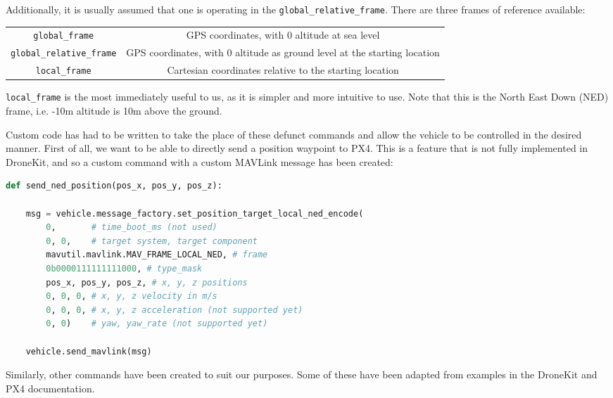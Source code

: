 \documentclass[11pt,twoside]{article}
\begin{document}
Additionally, it is usually assumed that one is operating in the \lstinline|global_relative_frame|. There are three frames of reference available:
\begin{center}
\begin{tabular}{cc}
    \lstinline|global_frame| & GPS coordinates, with 0 altitude at sea level \\
    \lstinline|global_relative_frame| & GPS coordinates, with 0 altitude as ground level at the starting location \\
    \lstinline|local_frame| & Cartesian coordinates relative to the starting location
\end{tabular}
\end{center}
\lstinline|local_frame| is the most immediately useful to us, as it is simpler and more intuitive to use. Note that this is the North East Down (NED) frame, i.e. -10m altitude is 10m above the ground.

Custom code has had to be written to take the place of these defunct commands and allow the vehicle to be controlled in the desired manner. First of all, we want to be able to directly send a position waypoint to PX4. This is a feature that is not fully implemented in DroneKit, and so a custom command with a custom MAVLink message has been created:
\begin{lstlisting}[language=Python]
def send_ned_position(pos_x, pos_y, pos_z):

    msg = vehicle.message_factory.set_position_target_local_ned_encode(
        0,       # time_boot_ms (not used)
        0, 0,    # target system, target component
        mavutil.mavlink.MAV_FRAME_LOCAL_NED, # frame
        0b0000111111111000, # type_mask
        pos_x, pos_y, pos_z, # x, y, z positions
        0, 0, 0, # x, y, z velocity in m/s
        0, 0, 0, # x, y, z acceleration (not supported yet)
        0, 0)    # yaw, yaw_rate (not supported yet)

    vehicle.send_mavlink(msg)
\end{lstlisting}

Similarly, other commands have been created to suit our purposes. Some of these have been adapted from examples in the DroneKit and PX4 documentation\cite{PX4_dev_guide}\cite{dronekit}.
\end{document}

